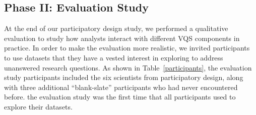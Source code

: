 \subsection{Phase II: Evaluation Study}
At the end of our participatory design study, we performed a qualitative evaluation to study how analysts interact with different VQS components in practice. In order to make the evaluation more realistic, we invited participants to use datasets that they have a vested interest in exploring to address unanswered research questions. As shown in Table~\ref{participants}, the evaluation study participants included the six scientists from participatory design, along with three additional ``blank-slate'' participants who had never encountered \zvpp before.   the evaluation study was the first time that all participants used \zvpp to explore their datasets.
